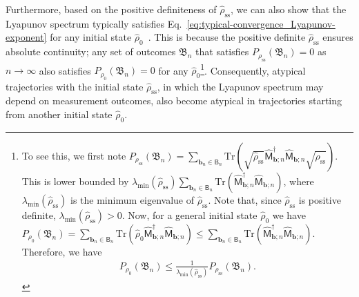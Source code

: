 \documentclass[preprint,pteplogo]{ptephy_v2}%
\numberwithin{equation}{section}
\theoremstyle{definition}
\begin{document}
Furthermore, based on the positive definiteness of $\hat{\rho}_\mathrm{ss}$, we can also show that the Lyapunov spectrum typically satisfies Eq.~\eqref{eq:typical-convergence_Lyapunov-exponent} for any initial state $\hat{\rho}_0$~\cite{benoist2019invariant}.
This is because the positive definite $\hat{\rho}_\mathrm{ss}$ ensures absolute continuity; any set of outcomes $\mathfrak{B}_n$ that satisfies $P_{\rho_\mathrm{ss}}(\mathfrak{B}_n)= 0$ as $n\rightarrow\infty$ also satisfies $P_{\rho_0}(\mathfrak{B}_n)= 0$ for any $\hat{\rho}_0$\footnote{
To see this, we first note 
$
P_{\rho_\mathrm{ss}}(\mathfrak{B}_n)=\sum_{\bm{b}_n \in \mathsf{B}_n}\mathrm{Tr}\left(\sqrt{\hat{\rho}_\mathrm{ss}}\hat{\mathsf{M}}_{{\bm{b};n}}^\dagger\hat{\mathsf{M}}_{{\bm{b};n}}\sqrt{\hat{\rho}_\mathrm{ss}}\right).
$
This is lower bounded by $\lambda_\mathrm{min}(\hat{\rho}_\mathrm{ss})\sum_{\bm{b}_n \in \mathsf{B}_n}\mathrm{Tr}\left(\hat{\mathsf{M}}_{{\bm{b};n}}^\dagger\hat{\mathsf{M}}_{{\bm{b};n}}\right)$, where $\lambda_\mathrm{min}(\hat{\rho}_\mathrm{ss})$ is the minimum eigenvalue of $\hat{\rho}_\mathrm{ss}$. 
Note that, since $\hat{\rho}_\mathrm{ss}$ is positive definite, $\lambda_\mathrm{min}(\hat{\rho}_\mathrm{ss})>0$.
Now, for a general initial state $\hat{\rho}_0$ we have
$
P_{\rho_0}(\mathfrak{B}_n)=\sum_{\bm{b}_n \in \mathsf{B}_n}\mathrm{Tr}\left(\hat{\rho}_0\hat{\mathsf{M}}_{{\bm{b};n}}^\dagger\hat{\mathsf{M}}_{{\bm{b};n}}\right
)\leq \sum_{\bm{b}_n \in \mathsf{B}_n}\mathrm{Tr}\left(\hat{\mathsf{M}}_{{\bm{b};n}}^\dagger\hat{\mathsf{M}}_{{\bm{b};n}}\right)
$. 
Therefore, we have
\begin{align}\label{eq:absolute}
P_{\rho_0}(\mathfrak{B}_n)\leq \frac{1}{\lambda_\mathrm{min}(\hat{\rho}_\mathrm{ss})}P_{\rho_\mathrm{ss}}(\mathfrak{B}_n).
\end{align}
}.
Consequently, atypical trajectories with the initial state $\hat{\rho}_\mathrm{ss}$, in which the Lyapunov spectrum may depend on measurement outcomes, also become atypical in trajectories starting from another initial state $\hat{\rho}_0$. 
\end{document}

